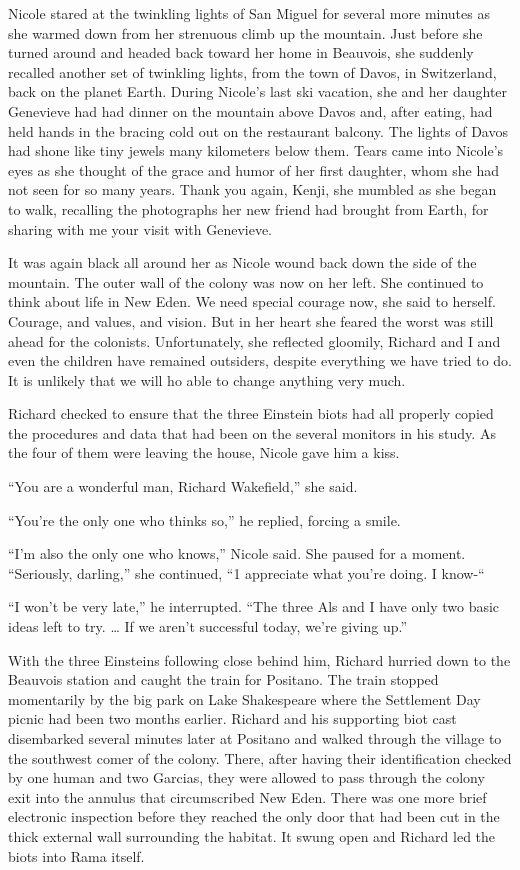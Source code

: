 \documentclass[]{article}
\begin{document}
{Nicole stared at the twinkling lights of San Miguel for several more minutes as she warmed down from her strenuous climb up the mountain.  Just before she turned around and headed back toward her home in Beauvois, she suddenly recalled another set of twinkling lights, from the town of Davos, in Switzerland, back on the planet Earth.  During Nicole’s last ski vacation, she and her daughter Genevieve had had dinner on the mountain above Davos and, after eating, had held hands in the bracing cold out on the restaurant balcony.  The lights of Davos had shone like tiny jewels many kilometers below them.  Tears came into Nicole’s eyes as she thought of the grace and humor of her first daughter, whom she had not seen for so many years.  Thank you again, Kenji, she mumbled as she began to walk, recalling the photographs her new friend had brought from Earth, for sharing with me your visit with Genevieve.

It was again black all around her as Nicole wound back down the side of the mountain.  The outer wall of the colony was now on her left.  She continued to think about life in New Eden.  We need special courage now, she said to herself.  Courage, and values, and vision.  But in her heart she feared the worst was still ahead for the colonists.  Unfortunately, she reflected gloomily, Richard and I and even the children have remained outsiders, despite everything we have tried to do.  It is unlikely that we will ho able to change anything very much.

Richard checked to ensure that the three Einstein biots had all properly copied the procedures and data that had been on the several monitors in his study.  As the four of them were leaving the house, Nicole gave him a kiss.

“You are a wonderful man, Richard Wakefield,” she said.

“You’re the only one who thinks so,” he replied, forcing a smile.

“I’m also the only one who knows,” Nicole said.  She paused for a moment.  “Seriously, darling,” she continued, “1 appreciate what you’re doing.  I know-“

“I won’t be very late,” he interrupted.  “The three Als and I have only two basic ideas left to try.  … If we aren’t successful today, we’re giving up.”

With the three Einsteins following close behind him, Richard hurried down to the Beauvois station and caught the train for Positano.  The train stopped momentarily by the big park on Lake Shakespeare where the Settlement Day picnic had been two months earlier.  Richard and his supporting biot cast disembarked several minutes later at Positano and walked through the village to the southwest comer of the colony.  There, after having their identification checked by one human and two Garcias, they were allowed to pass through the colony exit into the annulus that circumscribed New Eden.  There was one more brief electronic inspection before they reached the only door that had been cut in the thick external wall surrounding the habitat.  It swung open and Richard led the biots into Rama itself.

}
\end{document}
